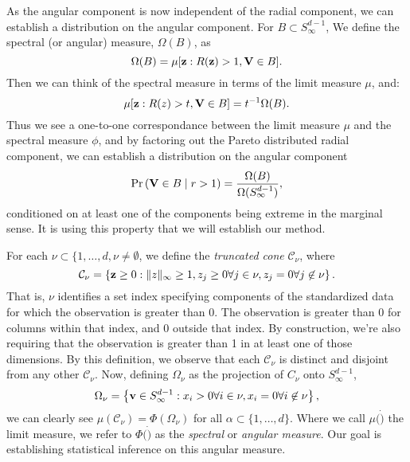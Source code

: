 As the angular component is now independent of the radial component, we can
  establish a distribution on the angular component.  For
  $B\subset S_{\infty}^{d-1}$, We define the spectral (or angular) measure,
  $\Omega(B)$, as
\begin{equation}
  \Omega(B) = \mu[{\bf z}: R({\bf z}) > 1, {\bf V} \in B].
\end{equation}
Then we can think of the spectral measure in terms of the limit measure $\mu$,
  and:
\begin{equation}
  \mu[{\bf z}:R(z)>t, {\bf V}\in B] = t^{-1}\Omega(B).
\end{equation}
Thus we see a one-to-one correspondance between the limit measure $\mu$ and the
  spectral measure $\phi$, and by factoring out the Pareto distributed radial
  component, we can establish a distribution on the angular component
\begin{equation}
  \text{Pr}\left({\bf V} \in B \mid r > 1\right) = \frac{\Omega(B)}{\Omega(S_{\infty}^{d-1})},
\end{equation}
conditioned on at least one of the components being extreme in the marginal
  sense.  It is using this property that we will establish our method.

For each $\nu\subset\lbrace{1,\ldots,d}, \nu \neq \emptyset$, we define the
  \emph{truncated cone} $\mathcal{C}_{\nu}$, where
\begin{equation}
    \mathcal{C}_{\nu} = \left\lbrace {\bf z} \geq 0 : \lVert z\rVert_{\infty}\geq 1, z_j \geq 0 \forall j \in \nu, z_j = 0 \forall j \not\in \nu\right\rbrace.
\end{equation}
That is, $\nu$ identifies a set index specifying components of the standardized
  data for which the observation is greater than 0.  The observation is greater
  than 0 for columns within that index, and 0 outside that index.  By
  construction, we're also requiring that the observation is greater than 1 in
  at least one of those dimensions.  By this definition, we observe that each
  $\mathcal{C}_{\nu}$ is distinct and disjoint from any other
  $\mathcal{C}_{\nu}$.  Now, defining $\Omega_{\nu}$ as the projection of
  $C_{\nu}$ onto $S_{\infty}^{d-1}$,
\begin{equation}
    \Omega_{\nu} = \left\lbrace {\bf v} \in S_{\infty}^{d-1} : x_i > 0 \forall i \in \nu, x_i = 0 \forall i \not\in \nu\right\rbrace,
\end{equation}
we can clearly see $\mu(\mathcal{C}_\nu) = \Phi(\Omega_{\nu})$ for all
  $\alpha \subset\lbrace1,\ldots,d\rbrace$.  Where we call $\mu(\dot)$ the limit
  measure, we refer to $\Phi(\dot)$ as the \emph{spectral} or
  \emph{angular measure}.  Our goal is establishing statistical inference on this
  angular measure.

